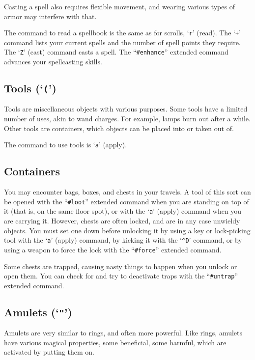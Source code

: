 Casting a spell also requires flexible movement, and wearing various types
of armor may interfere with that.

The command to read a spellbook is the same as for scrolls, `{\tt r}'
(read).  The `{\tt +}' command lists your current spells and the number of
spell points they require.  The `{\tt Z}' (cast) command casts a spell.
The ``{\tt \#enhance}'' extended command advances your spellcasting skills.
\subsection*{Tools (`{\tt (}')}


Tools are miscellaneous objects with various purposes.  Some tools
have a limited number of uses, akin to wand charges.  For example, lamps burn
out after a while.  Other tools are containers, which objects can
be placed into or taken out of.

The command to use tools is `{\tt a}' (apply).
\subsection*{Containers}


You may encounter bags, boxes, and chests in your travels.  A tool of
this sort can be opened with the ``{\tt \#loot}'' extended command when
you are standing on top of it (that is, on the same floor spot),
or with the `{\tt a}' (apply) command when you are carrying it.  However,
chests are often locked, and are in any case unwieldy objects.
You must set one down before unlocking it by
using a key or lock-picking tool with the `{\tt a}' (apply) command,
by kicking it with the `{\tt \^{}D}' command,
or by using a weapon to force the lock with the ``{\tt \#force}'' extended command.

Some chests are trapped, causing nasty things to happen when you
unlock or open them.  You can check for and try to deactivate traps
with the ``{\tt \#untrap}'' extended command.
\subsection*{Amulets (`{\tt "}')}


Amulets are very similar to rings, and often more powerful.  Like
rings, amulets have various magical properties, some beneficial,
some harmful, which are activated by putting them on.


